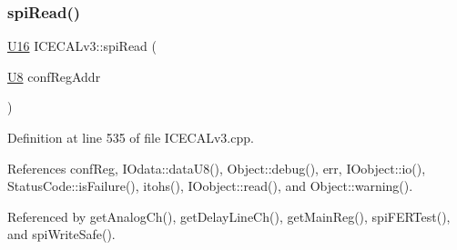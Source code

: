 \subsubsection{\texorpdfstring{spi\+Read()}{spiRead()}}
{\footnotesize\ttfamily \hyperlink{ICECALv3_8h_adf928e51a60dba0df29d615401cc55a8}{U16} I\+C\+E\+C\+A\+Lv3\+::spi\+Read (\begin{DoxyParamCaption}\item[{\hyperlink{ICECALv3_8h_a3cb25ca6f51f003950f9625ff05536fc}{U8}}]{conf\+Reg\+Addr }\end{DoxyParamCaption})\hspace{0.3cm}{\ttfamily [private]}}



Definition at line 535 of file I\+C\+E\+C\+A\+Lv3.\+cpp.



References conf\+Reg, I\+Odata\+::data\+U8(), Object\+::debug(), err, I\+Oobject\+::io(), Status\+Code\+::is\+Failure(), itohs(), I\+Oobject\+::read(), and Object\+::warning().



Referenced by get\+Analog\+Ch(), get\+Delay\+Line\+Ch(), get\+Main\+Reg(), spi\+F\+E\+R\+Test(), and spi\+Write\+Safe().


